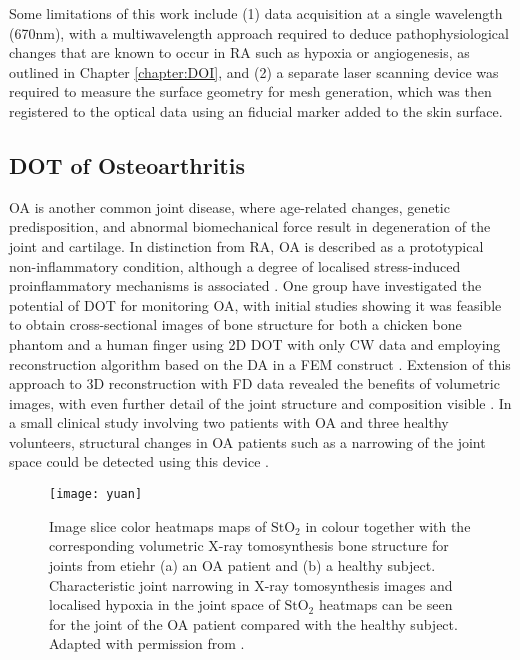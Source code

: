 \documentclass[twoside]{bhamthesis}
\theoremstyle{definition}
\begin{document}
Some limitations of this work include (1) data acquisition at a single wavelength (670nm), with a multiwavelength approach required to deduce pathophysiological changes that are known to occur in RA such as hypoxia or angiogenesis, as outlined in Chapter \ref{chapter:DOI}, and (2) a separate laser scanning device was required to measure the surface geometry for mesh generation, which was then registered to the optical data using an fiducial marker added to the skin surface.

\subsection{DOT of Osteoarthritis}

OA is another common joint disease, where age-related changes, genetic predisposition, and abnormal biomechanical force result in degeneration of the joint and cartilage. In distinction from RA, OA is described as a prototypical non-inflammatory condition, although a degree of localised stress-induced proinflammatory mechanisms is associated \cite{goldring2011inflammation}. One group have investigated the potential of DOT for monitoring OA, with initial studies showing it was feasible to obtain cross-sectional images of bone structure for both a chicken bone phantom and a human finger using 2D DOT with only CW data and employing reconstruction algorithm based on the DA in a FEM construct \cite{xu2001imaging}. Extension of this approach to 3D reconstruction with FD data revealed the benefits of volumetric images, with even further detail of the joint structure and composition visible \cite{xu2002three,zhang2005three}. In a small clinical study involving two patients with OA and three healthy volunteers, structural changes in OA patients such as a narrowing of the joint space could be detected using this device \cite{yuan2007three}.

\begin{figure}[!ht]
\texttt{[image: yuan]}
\centering
\caption{Image slice color heatmaps maps of $\mathrm{StO_2}$ in colour together with the corresponding volumetric X-ray tomosynthesis bone structure for joints from etiehr (a) an OA patient and (b) a healthy subject. Characteristic joint narrowing in X-ray tomosynthesis images and localised hypoxia in the joint space of $\mathrm{StO_2}$ heatmaps can be seen for the joint of the OA patient compared with the healthy subject. Adapted with permission from \cite{yuan2010image}.}
\centering
\label{fig:YuanExample}
\end{figure}
\end{document}
